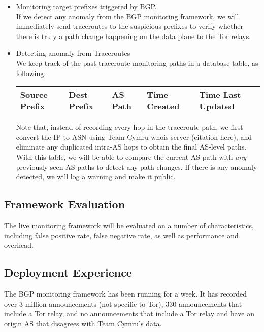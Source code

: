 \begin{itemize}
\item Monitoring target prefixes triggered by BGP.\\
If we detect any anomaly from the BGP monitoring framework, we will immediately send traceroutes to the suspicious prefixes to verify whether there is truly a path change happening on the data plane to the Tor relays. 

\item Detecting anomaly from Traceroutes\\
We keep track of the past traceroute monitoring paths in a database table, as following:
\begin{center}
\begin{tabular}{ p{9mm} | p{9mm} | p{6mm} | p{1.2cm} | p{1.2cm}} %
  \hline			
  Source Prefix & Dest Prefix & AS Path & Time Created & Time Last Updated \\ %
  \hline  
\end{tabular}
\label{tab:pathinfo}
\end{center}
Note that, instead of recording every hop in the traceroute path, we first convert the IP to ASN using Team Cymru whois server (citation here), and eliminate any duplicated intra-AS hops to obtain the final AS-level paths. With this table, we will be able to compare the current AS path with \emph{any} previously seen AS paths to detect any path changes. If there is any anomaly detected, we will log a warning and make it public. 

\end{itemize}

\subsection{Framework Evaluation}
The live monitoring framework will be evaluated on a number of characteristics, including false positive rate, false negative rate, as well as performance and overhead. 

\subsection{Deployment Experience}
The BGP monitoring framework has been running for a week.  It has recorded over 3 million announcements (not specific to Tor), 330 announcements that include a Tor relay, and no announcements that include a Tor relay and have an origin AS that disagrees with Team Cymru's data.  

